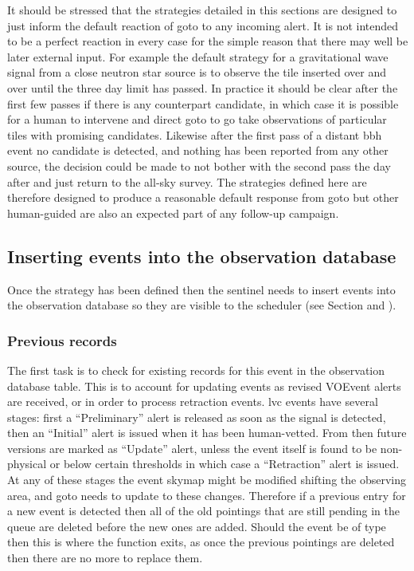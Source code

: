 \begin{colsection}
\begin{colsection}
It should be stressed that the strategies detailed in this sections are designed to just inform the default reaction of \gls{goto} to any incoming alert. It is not intended to be a perfect reaction in every case for the simple reason that there may well be later external input. For example the default strategy for a gravitational wave signal from a close neutron star source is to observe the tile inserted over and over until the three day limit has passed. In practice it should be clear after the first few passes if there is any counterpart candidate, in which case it is possible for a human to intervene and direct \gls{goto} to go take observations of particular tiles with promising candidates. Likewise after the first pass of a distant \gls{bbh} event no candidate is detected, and nothing has been reported from any other source, the decision could be made to not bother with the second pass the day after and just return to the all-sky survey. The strategies defined here are therefore designed to produce a reasonable default response from \gls{goto} but other human-guided are also an expected part of any follow-up campaign.

\end{colsection}


\newpage
\subsection{Inserting events into the observation database}
\label{sec:event_insert}
\begin{colsection}

Once the strategy has been defined then the sentinel needs to insert events into the observation database so they are visible to the scheduler (see Section  and ).

\subsubsection{Previous records}

The first task is to check for existing records for this event in the observation database  table. This is to account for updating events as revised VOEvent alerts are received, or in order to process retraction events. \gls{lvc} events have several stages: first a ``Preliminary'' alert is released as soon as the signal is detected, then an ``Initial'' alert is issued when it has been human-vetted. From then future versions are marked as ``Update'' alert, unless the event itself is found to be non-physical or below certain thresholds in which case a ``Retraction'' alert is issued. At any of these stages the event skymap might be modified shifting the observing area, and \gls{goto} needs to update to these changes. Therefore if a previous entry for a new event is detected then all of the old pointings that are still pending in the queue are deleted before the new ones are added. Should the event be of type  then this is where the function exits, as once the previous pointings are deleted then there are no more to replace them.


\end{colsection}
\end{colsection}
